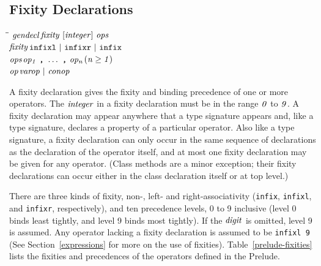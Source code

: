 \subsection{Fixity Declarations}
\label{fixity}

\begin{flushleft}\it\begin{tabbing}
\hspace{0.6in}\=\hspace{3.1in}\=\kill
$\it gendecl$\>\makebox[3.5em]{$\rightarrow$}$\it fixity\ [integer]\ ops$\\ 
$\it fixity$\>\makebox[3.5em]{$\rightarrow$}$\it \makebox{\tt infixl}\ |\ \makebox{\tt infixr}\ |\ \makebox{\tt infix}$\\ 
$\it ops$\>\makebox[3.5em]{$\rightarrow$}$\it op_1\ \makebox{\tt ,}\ \ldots \ \makebox{\tt ,}\ op_n$\>\makebox[3em]{}$\it (n\geq 1)$\\ 
$\it op$\>\makebox[3.5em]{$\rightarrow$}$\it varop\ |\ conop$
\end{tabbing}\end{flushleft}
%
%
%
%
A fixity declaration gives the fixity and binding
precedence of one or more operators.  The \mbox{$\it integer$} in a fixity declaration
must be in the range \mbox{$\it 0$} to \mbox{$\it 9$}.
A fixity declaration may appear anywhere that 
a type signature appears and, like a type signature, declares a property of
a particular operator.  Also like a type signature,
a fixity declaration can only occur in the same sequence of declarations as
the declaration of the operator itself, and at most one fixity declaration
may be given for any operator.  (Class methods are a minor exception;
their fixity declarations can occur either in the class declaration itself
or at top level.)

There are three kinds of fixity, non-, left- and right-associativity
(\mbox{\tt infix}, \mbox{\tt infixl}, and \mbox{\tt infixr}, respectively), and ten precedence
levels, 0 to 9 inclusive (level 0 binds least tightly, and level 9
binds most tightly).  If the \mbox{$\it digit$} is omitted, level 9 is assumed.
Any operator lacking a fixity declaration
is assumed to be \mbox{\tt infixl\ 9} (See Section~\ref{expressions} for more on
the use of fixities).
Table~\ref{prelude-fixities} lists the fixities and precedences of
the operators defined in the Prelude.


